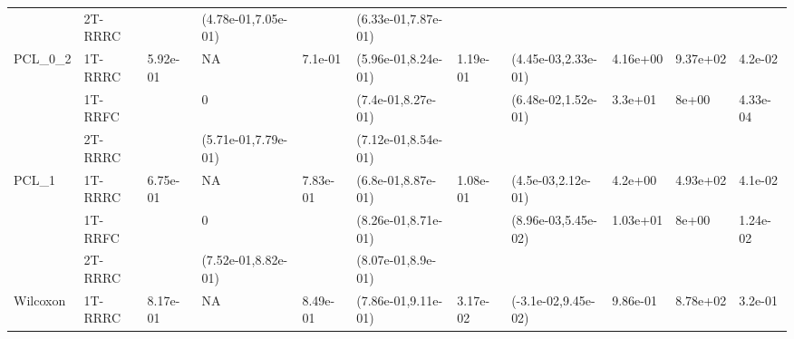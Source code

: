 \documentclass[
]{book}
\begin{document}
\begin{table}[H]
{\begin{tabular}[t]{lllllllllll}
\cmidrule{2-2}
\cmidrule{4-4}
\cmidrule{6-6}
\cmidrule{8-11}
 & 2T-RRRC &  & (4.78e-01,7.05e-01) &  & (6.33e-01,7.87e-01) &  &  &  &  & \\
\cmidrule{2-2}
\cmidrule{4-4}
\cmidrule{6-6}
\multirow{-3}{*}{\raggedright\arraybackslash PCL\_0\_2} & 1T-RRRC & \multirow{-3}{*}{\raggedright\arraybackslash 5.92e-01} & NA & \multirow{-3}{*}{\raggedright\arraybackslash 7.1e-01} & (5.96e-01,8.24e-01) & \multirow{-3}{*}{\raggedright\arraybackslash 1.19e-01} & \multirow{-2}{*}{\raggedright\arraybackslash (4.45e-03,2.33e-01)} & \multirow{-2}{*}{\raggedright\arraybackslash 4.16e+00} & \multirow{-2}{*}{\raggedright\arraybackslash 9.37e+02} & \multirow{-2}{*}{\raggedright\arraybackslash 4.2e-02}\\
\cmidrule{1-11}
 & 1T-RRFC &  & 0 &  & (7.4e-01,8.27e-01) &  & (6.48e-02,1.52e-01) & 3.3e+01 & 8e+00 & 4.33e-04\\
\cmidrule{2-2}
\cmidrule{4-4}
\cmidrule{6-6}
\cmidrule{8-11}
 & 2T-RRRC &  & (5.71e-01,7.79e-01) &  & (7.12e-01,8.54e-01) &  &  &  &  & \\
\cmidrule{2-2}
\cmidrule{4-4}
\cmidrule{6-6}
\multirow{-3}{*}{\raggedright\arraybackslash PCL\_1} & 1T-RRRC & \multirow{-3}{*}{\raggedright\arraybackslash 6.75e-01} & NA & \multirow{-3}{*}{\raggedright\arraybackslash 7.83e-01} & (6.8e-01,8.87e-01) & \multirow{-3}{*}{\raggedright\arraybackslash 1.08e-01} & \multirow{-2}{*}{\raggedright\arraybackslash (4.5e-03,2.12e-01)} & \multirow{-2}{*}{\raggedright\arraybackslash 4.2e+00} & \multirow{-2}{*}{\raggedright\arraybackslash 4.93e+02} & \multirow{-2}{*}{\raggedright\arraybackslash 4.1e-02}\\
\cmidrule{1-11}
 & 1T-RRFC &  & 0 &  & (8.26e-01,8.71e-01) &  & (8.96e-03,5.45e-02) & 1.03e+01 & 8e+00 & 1.24e-02\\
\cmidrule{2-2}
\cmidrule{4-4}
\cmidrule{6-6}
\cmidrule{8-11}
 & 2T-RRRC &  & (7.52e-01,8.82e-01) &  & (8.07e-01,8.9e-01) &  &  &  &  & \\
\cmidrule{2-2}
\cmidrule{4-4}
\cmidrule{6-6}
\multirow{-3}{*}{\raggedright\arraybackslash Wilcoxon} & 1T-RRRC & \multirow{-3}{*}{\raggedright\arraybackslash 8.17e-01} & NA & \multirow{-3}{*}{\raggedright\arraybackslash 8.49e-01} & (7.86e-01,9.11e-01) & \multirow{-3}{*}{\raggedright\arraybackslash 3.17e-02} & \multirow{-2}{*}{\raggedright\arraybackslash (-3.1e-02,9.45e-02)} & \multirow{-2}{*}{\raggedright\arraybackslash 9.86e-01} & \multirow{-2}{*}{\raggedright\arraybackslash 8.78e+02} & \multirow{-2}{*}{\raggedright\arraybackslash 3.2e-01}\\
\bottomrule
\end{tabular}}
\end{table}
\end{document}
